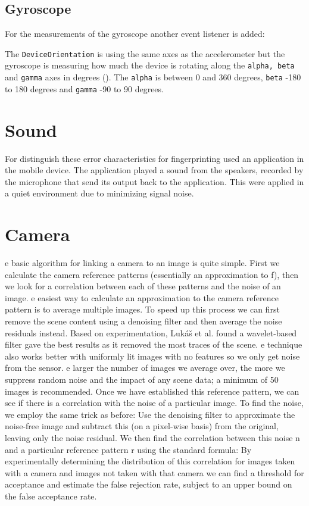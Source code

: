 \subsection{Gyroscope}
For the measurements of the gyroscope another event listener is added:

The \texttt{DeviceOrientation} is using the same axes as the accelerometer but the gyroscope is measuring how much the device is rotating along the \texttt{alpha, beta} and \texttt{gamma} axes in degrees (). The \texttt{alpha} is between 0 and 360 degrees, \texttt{beta} -180 to 180 degrees and \texttt{gamma} -90 to 90 degrees. \citet{sensor:DeviceOrientation:spec}

\section{Sound}\label{sec:test:sound}
For distinguish these error characteristics for fingerprinting \cite{sensor:micSpek} used an application in the mobile device. The application played a sound from the speakers, recorded by the microphone that send its output back to the application. This were applied in a quiet environment due to minimizing signal noise.

\section{Camera}\label{sec:test:camera}
e basic algorithm for linking a camera to an image is quite simple. First we calculate the camera reference patterns (essentially an approximation to f), then we look for a correlation between each of these patterns and the noise of an image. e easiest way to calculate an approximation to the camera reference pattern is to average multiple images. To speed up this process we can first remove the scene content using a denoising filter and then average the noise residuals instead. Based on experimentation, Lukáš et al. found a wavelet-based filter gave the best results as it removed the most traces of the scene. e technique also works better with uniformly lit images with no features so we only get noise from the sensor. e larger the number of images we average over, the more we suppress random noise
and the impact of any scene data; a minimum of 50 images is recommended. Once we have established this reference pattern, we can see if there is a correlation with the noise of a particular image. To find the noise, we employ the same trick as before: Use the denoising filter to approximate the noise-free image and subtract this (on a pixel-wise basis) from the original, leaving only the noise residual. We then find the correlation between this noise n and a particular reference pattern r using the standard formula:
By experimentally determining the distribution of this correlation for images taken with a camera and images not taken with that camera we can find a threshold for acceptance and estimate the false rejection rate, subject to an upper bound on
the false acceptance rate. \cite[p.2]{sensor:camera:DCIdent}


